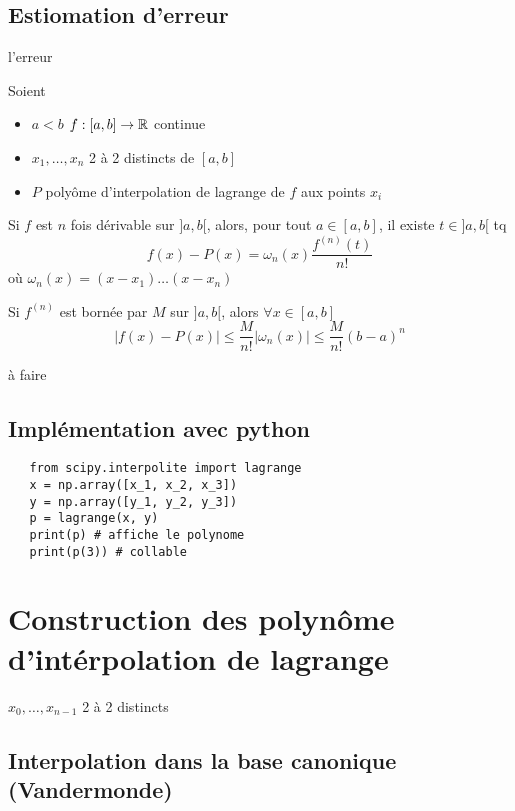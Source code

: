 \subsection{Estiomation d'erreur}
\begin{theorem}
    l'erreur  \par
    Soient
    \begin{itemize}
        \item $a < b$  $f: [a, b] \to \mathbb{R}$ continue
        \item $x_1, \ldots, x_n$ 2 à 2 distincts de $[a, b]$
        \item  $P$ polyôme d'interpolation de lagrange de  $f$ aux points  $x_i$
    \end{itemize}
    Si $f$ est $n$ fois dérivable sur  $]a, b[$, alors, pour tout  $a \in [a, b]$, il existe  $t \in ]a, b[$ tq 
     \[
         f(x) - P(x) = \omega_n(x)\frac{f^{(n)}(t)}{n!}
    \] 
    où $\omega_n(x) = (x - x_1)\ldots(x - x_n)$
\end{theorem}
\begin{corollary}
    Si $f^{(n)}$ est bornée par  $M$ sur  $]a, b[$, alors  $\forall x \in [a, b]$ 
    \[
    |f(x) - P(x)| \le \frac{M}{n!}|\omega_n(x)| \le \frac{M}{n!}(b - a)^n
    \] 
\end{corollary}
\begin{preuve}
    à faire
\end{preuve}

\subsection{Implémentation avec python}
\begin{lstlisting}
   from scipy.interpolite import lagrange
   x = np.array([x_1, x_2, x_3])
   y = np.array([y_1, y_2, y_3])
   p = lagrange(x, y)
   print(p) # affiche le polynome
   print(p(3)) # collable
\end{lstlisting}

\section{Construction des polynôme d'intérpolation de lagrange}
$x_0, \ldots, x_{n-1}$ 2 à 2 distincts
\subsection{Interpolation dans la base canonique (Vandermonde)}
